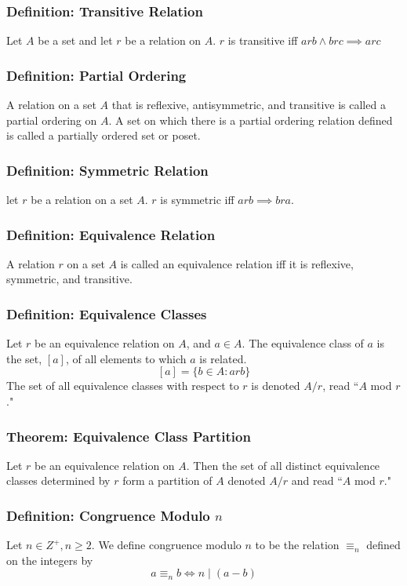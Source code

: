 \documentclass{article}
\begin{document}
\subsubsection*{Definition: Transitive Relation}
Let $A$ be a set and let $r$ be a relation on $A$. $r$ is transitive iff $arb \land brc \implies arc$

\subsubsection*{Definition: Partial Ordering}
A relation on a set $A$ that is reflexive, antisymmetric, and transitive is called a partial ordering on $A$. A set on which there is a partial ordering relation defined is called a partially ordered set or poset. 

\subsubsection*{Definition: Symmetric Relation}
let $r$ be a relation on a set $A$. $r$ is symmetric iff $arb \implies bra$.

\subsubsection*{Definition: Equivalence Relation}
A relation $r$ on a set $A$ is called an equivalence relation iff it is reflexive, symmetric, and transitive. 

\subsubsection*{Definition: Equivalence Classes}
Let $r$ be an equivalence relation on $A$, and $a \in A$. The equivalence class of $a$ is the set, $\left[ a \right]$, of all elements to which $a$ is related.
$$\left[ a \right] = \{ b \in A : arb \}$$
The set of all equivalence classes with respect to $r$ is denoted $A / r$, read ``$A$ mod $r$."

\subsubsection*{Theorem: Equivalence Class Partition}
Let $r$ be an equivalence relation on $A$. Then the set of all distinct equivalence classes determined by $r$ form a partition of $A$ denoted $A / r$ and read ``$A$ mod $r$."

\subsubsection*{Definition: Congruence Modulo $n$}
Let $n \in Z ^+, n \geq 2$. We define congruence modulo $n$ to be the relation $\equiv_n$ defined on the integers by 
$$a \equiv_n b \iff n \mid (a -b)$$
\end{document}
